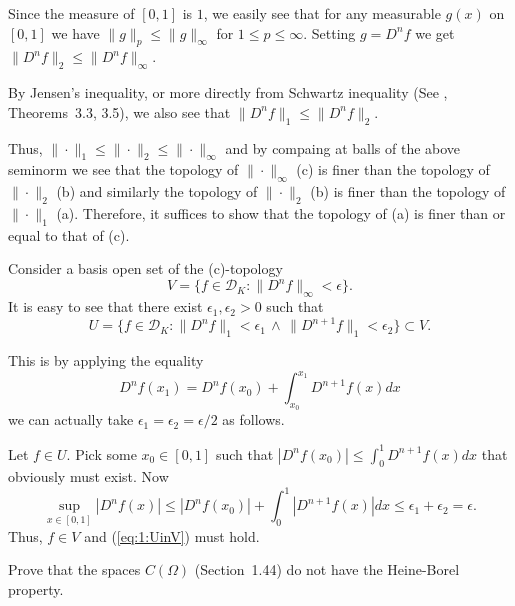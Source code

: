 \begin{enumerate}
Since the measure of \([0,1]\) is $1$, we easily see that
for any measurable \(g(x)\) on \([0,1]\) we have
\(\|g\|_p \leq \|g\|_\infty \) for \(1\leq p \leq \infty\). 
Setting \(g=D^n f\) we get
 \(\|D^n f\|_2 \leq \|D^n f\|_\infty\).

By Jensen's inequality, 
or more directly from 
Schwartz inequality (See \cite{RudinRCA80}, Theorems~3.3, 3.5),
we also see that \(\|D^n f\|_1 \leq \|D^n f\|_2\).

Thus, \( \|\cdot\|_1 \leq \|\cdot\|_2 \leq \|\cdot\|_\infty\)
and by compaing at balls of the above seminorm
we see that 
the topology of 
\(\|\cdot\|_\infty\) (c) is finer than the topology of \(\|\cdot\|_2\) (b)
and similarly
the topology of 
\(\|\cdot\|_2\) (b) is finer than the topology of \(\|\cdot\|_1\) (a).
Therefore, it suffices to show that the topology of (a) is finer than or equal
to that of (c).

Consider a basis open set of the (c)-topology 
\begin{equation*}
 V = \{f\in \mathcal{D}_K: \|D^n f\|_\infty < \epsilon\}.
\end{equation*}
It is easy to see that there exist \(\epsilon_1,\epsilon_2>0\) such that
\begin{equation} \label{eq:1:UinV}
 U = \{f\in \mathcal{D}_K: 
          \|D^n f\|_1 < \epsilon_1 
          \,\wedge\,
          \|D^{n+1} f\|_1 < \epsilon_2 
      \} \subset V.
\end{equation}

This is by applying the equality
\begin{equation*}
D^n f(x_1) = D^n f(x_0) + \int_{x_0}^{x_1} D^{n+1} f(x)dx
\end{equation*}
we can actually take \(\epsilon_1 = \epsilon_2 = \epsilon/2\) as follows.

Let \(f\in U\).
Pick some \(x_0\in[0,1]\) 
such that \(|D^n f(x_0)| \leq \int_0^1 D^{n+1} f(x)dx\)
that obviously must exist. Now
\begin{equation*}
\sup_{x\in[0,1]} |D^n f(x)| \leq |D^n f(x_0)| + \int_0^1 |D^{n+1} f(x)|dx
 \leq \epsilon_1 + \epsilon_2 = \epsilon.
\end{equation*}
Thus, \(f\in V\) and (\ref{eq:1:UinV}) must hold.

\begin{excopy}
Prove that the spaces \(C(\Omega)\) (Section~1.44) do not have the
Heine-Borel property.
\end{excopy}


\end{enumerate}
